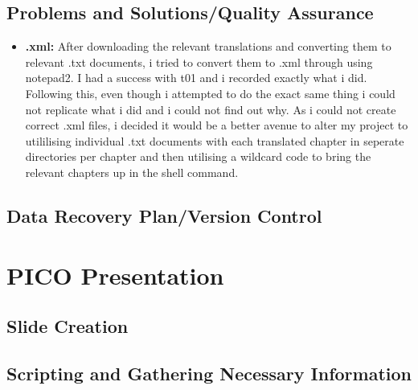 \documentclass{article}
\begin{document}
\subsection{Problems and Solutions/Quality Assurance}

\begin{itemize}
    \item{\textbf{.xml:} After downloading the relevant translations and converting them to relevant .txt documents, i tried to convert them to .xml through using notepad2. I had a success with t01 and i recorded exactly what i did. Following this, even though i attempted to do the exact same thing i could not replicate what i did and i could not find out why. As i could not create correct .xml files, i decided it would be a better avenue to alter my project to utililising individual .txt documents with each translated chapter in seperate directories per chapter and then utilising a wildcard code to bring the relevant chapters up in the shell command.}
    
   
\end{itemize}



\subsection{Data Recovery Plan/Version Control}




\section{PICO Presentation}

\subsection{Slide Creation}



\subsection{Scripting and Gathering Necessary Information}
\end{document}
